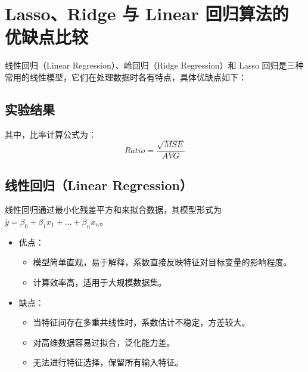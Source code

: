 \section{Lasso、Ridge 与 Linear 回归算法的优缺点比较}

线性回归（Linear Regression）、岭回归（Ridge Regression）和 Lasso 回归是三种常用的线性模型，它们在处理数据时各有特点，具体优缺点如下：
\subsection {实验结果}

\begin{table}[!hpt]
\centering
{}
\end{table}

\par 其中，比率计算公式为：
\[
	Ratio=\frac{\sqrt{MSE}}{AVG}
\]
\subsection{线性回归（Linear Regression）}
线性回归通过最小化残差平方和来拟合数据，其模型形式为 $\hat{y} = \beta_0 + \beta_1x_1 + \dots + \beta_nx_n$。

\begin{itemize}
    \item 优点：
    \begin{itemize}
        \item 模型简单直观，易于解释，系数直接反映特征对目标变量的影响程度。
        \item 计算效率高，适用于大规模数据集。
    \end{itemize}
    \item 缺点：
    \begin{itemize}
        \item 当特征间存在多重共线性时，系数估计不稳定，方差较大。
        \item 对高维数据容易过拟合，泛化能力差。
        \item 无法进行特征选择，保留所有输入特征。
    \end{itemize}
\end{itemize}

